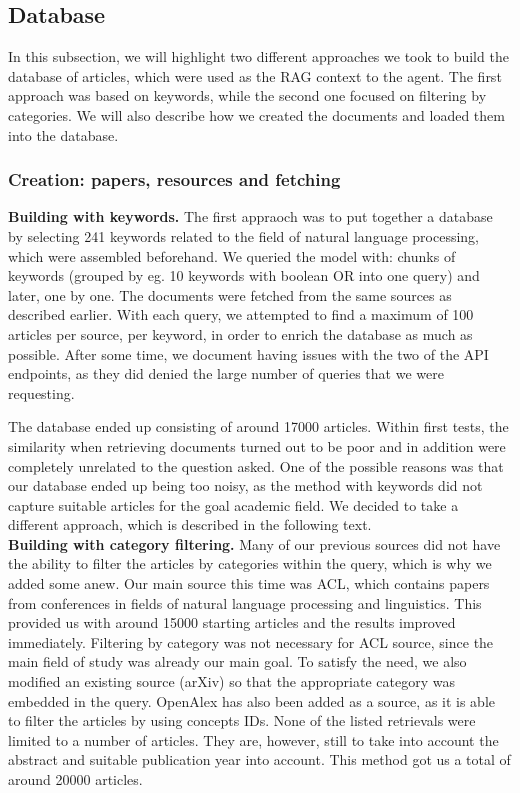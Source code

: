 \documentclass[fleqn,moreauthors,10pt]{ds_report}
\begin{document}
\subsection*{Database}

In this subsection, we will highlight two different approaches we took to build the database of articles, which were used as the RAG context to the agent. The first approach was based on keywords, while the second one focused on filtering by categories. We will also describe how we created the documents and loaded them into the database.

\subsubsection*{Creation: papers, resources and fetching}
\textbf{Building with keywords.} The first appraoch was to put together a database by selecting 241 keywords related to the field of natural language processing, which were assembled beforehand. We queried the model with: chunks of keywords (grouped by eg. 10 keywords with boolean OR into one query) and later, one by one. The documents were fetched from the same sources as described earlier. With each query, we attempted to find a maximum of 100 articles per source, per keyword, in order to enrich the database as much as possible. After some time, we document having issues with the two of the API endpoints, as they did denied the large number of queries that we were requesting.

The database ended up consisting of around 17000 articles. Within first tests, the similarity when retrieving documents turned out to be poor and in addition were completely unrelated to the question asked. One of the possible reasons was that our database ended up being too noisy, as the method with keywords did not capture suitable articles for the goal academic field. We decided to take a different approach, which is described in the following text.
\\
\textbf{Building with category filtering.} Many of our previous sources did not have the ability to filter the articles by categories within the query, which is why we added some anew. Our main source this time was ACL, which contains papers from conferences in fields of natural language processing and linguistics. This provided us with around 15000 starting articles and the results improved immediately. Filtering by category was not necessary for ACL source, since the main field of study was already our main goal. To satisfy the need, we also modified an existing source (arXiv) so that the appropriate category was embedded in the query. OpenAlex has also been added as a source, as it is able to filter the articles by using concepts IDs. None of the listed retrievals were limited to a number of articles. They are, however, still to take into account the abstract and suitable publication year into account. This method got us a total of around 20000 articles.
\end{document}
